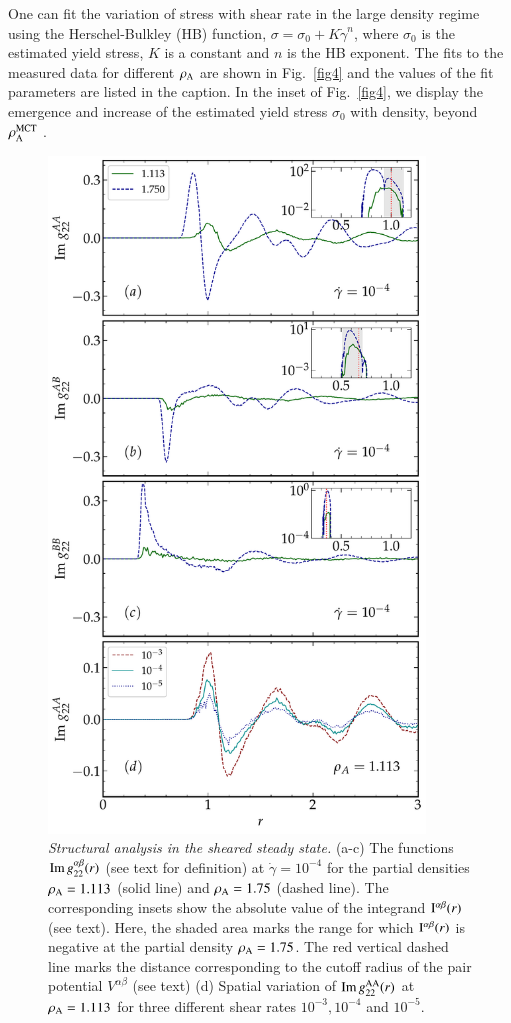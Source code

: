 One can fit the variation of stress with shear rate in the large density regime using the Herschel-Bulkley (HB) function, $\sigma = \sigma_0+K\dot{\gamma}^n$, where $\sigma_0$ is the estimated yield stress, $K$ is a constant and $n$ is the HB exponent. The fits to the measured data for different $\rho_{\rm A}$ are shown in Fig.~\ref{fig4} and the values of the fit parameters are listed in the caption. In the inset of Fig.~\ref{fig4}, we display the emergence and increase of the estimated yield stress $\sigma_0$ with density, beyond $\rho_{\rm A}^{\rm MCT}$ .

%
\begin{figure}[htb!]
\centering
\includegraphics[width=10cm]{figs/fig7p5.pdf}
\caption[{\em Structural analysis in the sheared steady state using $g_{22}^{\alpha \beta}(r)$}]{{\em Structural analysis in the sheared steady state.} (a-c) The functions ${\rm Im}\, g_{22}^{\alpha \beta}(r)$ (see text for definition) at $\dot{\gamma} = 10^{-4}$ for the partial densities $\rho_{\rm A} = 1.113$ (solid line) and $\rho_{\rm A} = 1.75$ (dashed line). The corresponding insets show the absolute value of the integrand ${\rm I}^{\alpha\beta}(r)$ (see text). Here, the shaded area marks the range for which ${\rm I}^{\alpha\beta}(r)$ is negative at the partial density $\rho_{\rm A} = 1.75$. The red vertical dashed line marks the distance corresponding to the cutoff radius of the pair potential $V^{\alpha\beta}$ (see text) (d) Spatial variation of ${\rm Im} \, g_{22}^{\rm AA}(r)$ at $\rho_{\rm A} = 1.113$ for three different shear rates $10^{-3}, 10^{-4}$ and $10^{-5}$.} \label{fig5} 
\end{figure}
%

